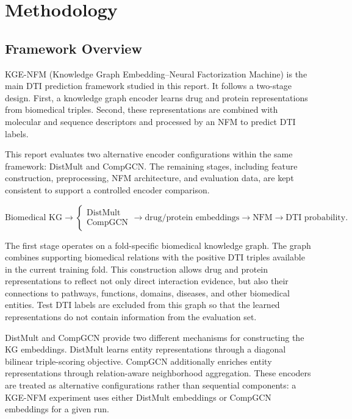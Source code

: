 \chapter{Methodology}
\label{chap:methodology}

\section{Framework Overview}

KGE-NFM (Knowledge Graph Embedding--Neural Factorization Machine) is the main
DTI prediction framework studied in this report. It follows a two-stage design.
First, a knowledge graph encoder learns drug and protein representations from
biomedical triples. Second, these representations are combined with molecular
and sequence descriptors and processed by an NFM to predict DTI labels.

This report evaluates two alternative encoder configurations within the same
framework: DistMult and CompGCN. The remaining stages, including feature
construction, preprocessing, NFM architecture, and evaluation data, are kept
consistent to support a controlled encoder comparison.

\begin{equation}
    \text{Biomedical KG}
    \rightarrow
    \left\{
        \begin{array}{c}
            \text{DistMult}\\
            \text{CompGCN}
        \end{array}
    \right.
    \rightarrow
    \text{drug/protein embeddings}
    \rightarrow
    \text{NFM}
    \rightarrow
    \text{DTI probability}.
\end{equation}

The first stage operates on a fold-specific biomedical knowledge graph. The
graph combines supporting biomedical relations with the positive DTI triples
available in the current training fold. This construction allows drug and
protein representations to reflect not only direct interaction evidence, but
also their connections to pathways, functions, domains, diseases, and other
biomedical entities. Test DTI labels are excluded from this graph so that the
learned representations do not contain information from the evaluation set.

DistMult and CompGCN provide two different mechanisms for constructing the KG
embeddings. DistMult learns entity representations through a diagonal
bilinear triple-scoring objective. CompGCN additionally enriches entity
representations through relation-aware neighborhood aggregation. These
encoders are treated as alternative configurations rather than sequential
components: a KGE-NFM experiment uses either DistMult embeddings or CompGCN
embeddings for a given run.

